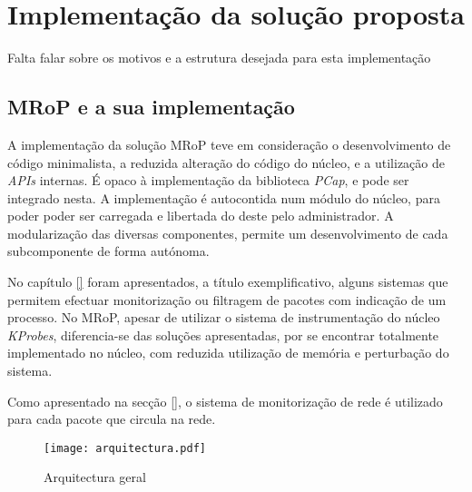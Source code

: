 \chapter{Implementação da solução proposta}
\label{cap:Implementacao}

Falta falar sobre os motivos e a estrutura desejada para esta implementação

\section{MRoP e a sua implementação}
\label{sec:mrop_implementation}

A implementação da solução MRoP teve em consideração o desenvolvimento de código minimalista, a reduzida alteração do código do núcleo, e a utilização de \textit{APIs} internas.
É opaco à implementação da biblioteca \textit{PCap}, e pode ser integrado nesta.
A implementação é autocontida num módulo do núcleo, para poder poder ser carregada e libertada do deste pelo administrador.
A modularização das diversas componentes, permite um desenvolvimento de cada subcomponente de forma autónoma.

No capítulo \ref{} foram apresentados, a título exemplificativo, alguns sistemas que permitem efectuar monitorização ou filtragem de pacotes com indicação de um processo.
No MRoP, apesar de utilizar o sistema de instrumentação do núcleo \textit{KProbes}, diferencia-se das soluções apresentadas, por se encontrar totalmente implementado no núcleo, com reduzida utilização de memória e perturbação do sistema.

Como apresentado na secção \ref{}, o sistema de monitorização de rede é utilizado para cada pacote que circula na rede.

\begin{figure}[ht]
\centering
\texttt{[image: arquitectura.pdf]}
\caption{Arquitectura geral}
\label{fig:general_architecture}
\end{figure}







